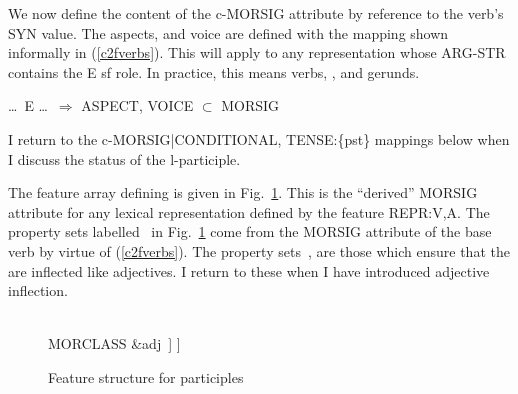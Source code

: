 \documentclass[output=paper,
modfonts
]{LSP/langsci}
\begin{document}
We now define the content of the c-MORSIG attribute by reference to the verb’s SYN value. The aspects, and voice are defined with the mapping shown informally in (\ref{c2fverbs}). This will apply to any representation whose ARG-STR contains the E sf role. In practice, this means verbs, , and gerunds.


\begin{exe}	\ex	\label{c2fverbs}

\ldots\ E \ldots\ $\Rightarrow$ ASPECT, VOICE $\subset$ MORSIG 
\end{exe}
I return to the c-MORSIG|CONDITIONAL, TENSE:\{pst\} mappings below when I discuss the status of the l-participle.


The  feature array defining  is given in Fig.~\ref{fig:Russptcps}. This is the ``derived'' MORSIG attribute for any lexical representation defined by the feature REPR:\lab V,A\rab. %
The property sets labelled \, in Fig.~\ref{fig:Russptcps} come from the MORSIG attribute of the base verb %
by virtue of (\ref{c2fverbs}). %
The property sets \,,  are those which ensure that the  are inflected like adjectives. I return to these when I have introduced adjective inflection. 


\begin{figure}[h]
 		\begin{avm}
 [MORSIG  [
 ASPECT		&\{ipfv, pfv\}\,\hpsgtag{1}\\
 VOICE		&\{act, pass\}\,\hpsgtag{2}\\
 CONCORD &[NUMBER		&\{sg, pl\}\\
 GENDER		&\{m, f, n\}\\
 CASE			&\{nom, \ldots\}
 		]\,\\
 MORCLASS	&adj\,
 ]
 ]
\end{avm}
\caption{Feature structure for  participles} 	\label{fig:Russptcps} 
	\end{figure}
\end{document}
